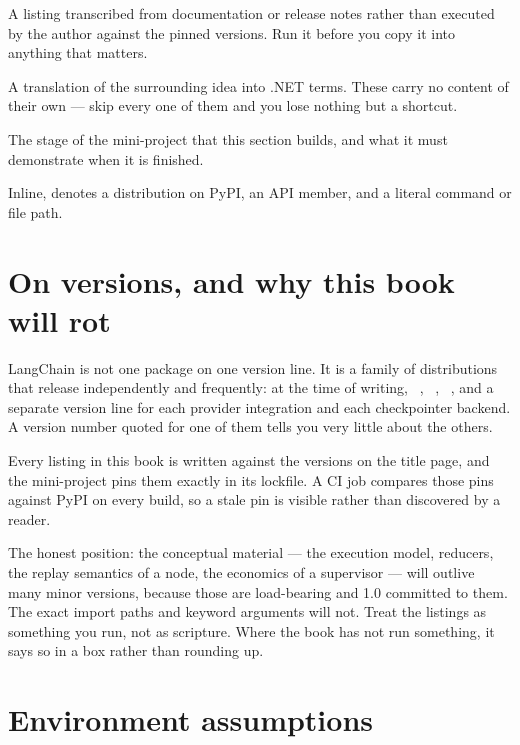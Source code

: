 \begin{verifybox}
A listing transcribed from documentation or release notes rather than executed by
the author against the pinned versions. Run it before you copy it into anything
that matters.
\end{verifybox}

\begin{dotnetbox}
A translation of the surrounding idea into .NET terms. These carry no content of
their own --- skip every one of them and you lose nothing but a shortcut.
\end{dotnetbox}

\begin{projectbox}
The stage of the mini-project that this section builds, and what it must
demonstrate when it is finished.
\end{projectbox}

\noindent
Inline,  denotes a distribution on PyPI,  an
API member, and  a literal command or file path.

\section*{On versions, and why this book will rot}

LangChain is not one package on one version line. It is a family of distributions
that release independently and frequently: at the time of writing,
~\lcver{}, ~\lccorever{},
~\lgver{}, and a separate version line for each provider
integration and each checkpointer backend. A version number quoted for one of
them tells you very little about the others.

Every listing in this book is written against the versions on the title page, and
the mini-project pins them exactly in its lockfile. A CI job compares those pins
against PyPI on every build, so a stale pin is visible rather than discovered by
a reader.

The honest position: the conceptual material --- the execution model, reducers,
the replay semantics of a node, the economics of a supervisor --- will outlive
many minor versions, because those are load-bearing and 1.0 committed to them.
The exact import paths and keyword arguments will not. Treat the listings as
something you run, not as scripture. Where the book has not run something, it
says so in a box rather than rounding up.

\section*{Environment assumptions}

